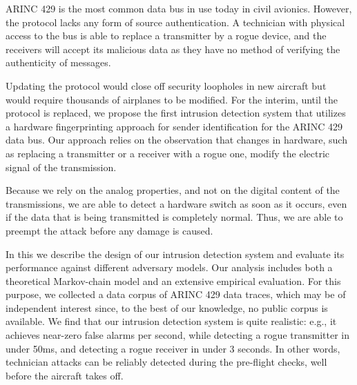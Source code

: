 ARINC 429 is the most common data bus in use today in civil avionics.
However, the protocol lacks any form of source authentication.
A technician with physical access to the bus is able to replace a transmitter by a rogue device, and the receivers will accept its malicious data as they have no method of verifying the authenticity of messages.

Updating the protocol would close off security loopholes in new aircraft but would require thousands of airplanes to be modified.
For the interim, until the protocol is replaced, we propose the first intrusion detection system that utilizes a hardware fingerprinting approach for sender identification for the ARINC 429 data bus.
Our approach relies on the observation that changes in hardware, such as replacing a transmitter or a receiver with a rogue one, modify the electric signal of the transmission. 

Because we rely on the analog properties, and not on the digital content of the transmissions, we are able to detect a hardware switch as soon as it occurs, even if the data that is being transmitted is completely normal.
Thus, we are able to preempt the attack before any damage is caused.

In this \iftoggle{paper} {paper} {work} we describe the design of our intrusion detection system and evaluate its performance against different adversary models.
Our analysis includes both a theoretical Markov-chain model and an extensive empirical evaluation.
For this purpose, we collected a data corpus of ARINC 429 data traces, which may be of independent interest since, to the best of our knowledge, no public corpus is available.
We find that our intrusion detection system is quite realistic: e.g., it achieves near-zero false alarms per second, while detecting a rogue transmitter in under 50ms, and detecting a rogue receiver in under 3 seconds.
In other words, technician attacks can be reliably detected during the pre-flight checks, well before the aircraft takes off.

